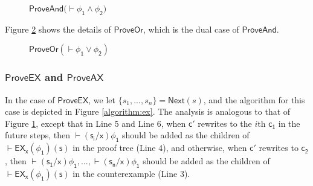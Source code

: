 \begin{figure}[h!]\footnotesize
	\centering
	\noindent{}
	\caption{$\mathsf{ProveAnd (\vdash\phi_1\wedge\phi_2})$}
	\label{algorithm:and}
\end{figure}
Figure \ref{algorithm:or} shows the details of $\mathsf{ProveOr}$, which is the dual case of $\mathsf{ProveAnd}$.
\begin{figure}[h!]\footnotesize
	\centering
	\noindent{}
	\caption{$\mathsf{ProveOr (\vdash\phi_1\vee\phi_2)}$}
	\label{algorithm:or}
\end{figure}



\subsubsection{$\mathsf{ProveEX}$ and $\mathsf{ProveAX}$}
In the case of $\mathsf{ProveEX}$, we let $\{s_1,...,s_n\}=\textsf{Next}(s)$, and the algorithm for this case is depicted in Figure \ref{algorithm:ex}. The analysis is analogous to that of Figure \ref{algorithm:and}, except that in Line 5 and Line 6, when $\mathsf{c'}$ rewrites to the $i$th $\mathsf{c_1}$ in the future steps, then $\mathsf{\vdash (s_i/x)\phi_1}$ should be added as the children of $\mathsf{\vdash EX_x(\phi_1)(s)}$ in the proof tree (Line 4), and otherwise, when $\mathsf{c'}$ rewrites to $\mathsf{c_2}$, then $\mathsf{\vdash (s_1/x)\phi_1}, ... , \mathsf{\vdash (s_n/x)\phi_1}$ should be added as the children of $\mathsf{\vdash EX_x(\phi_1)(s)}$ in the counterexample (Line 3).


